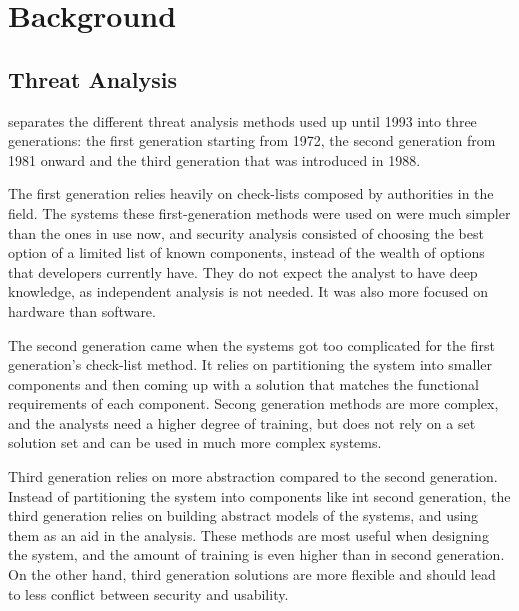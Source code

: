 \chapter{Background}
\label{chapter:background} 


\section{Threat Analysis}



\newpage
{}


\citet{threat_analysis_1993} separates the different threat analysis methods used up until 1993 into three generations: the first generation starting from 1972, the second generation from 1981 onward and the third generation that was introduced in 1988.

The first generation relies heavily on check-lists composed by authorities in the field. 
The systems these first-generation methods were used on were much simpler than the ones in use now, and security analysis consisted of choosing the best option of a limited list of known components, instead of the wealth of options that developers currently have.
They do not expect the analyst to have deep knowledge, as independent analysis is not needed.
It was also more focused on hardware than software. \cite{threat_analysis_1993}

The second generation came when the systems got too complicated for the first generation's check-list method. 
It relies on partitioning the system into smaller components and then coming up with a solution that matches the functional requirements of each component.
Secong generation methods are more complex, and the analysts need a higher degree of training, but does not rely on a set solution set and can be used in much more complex systems. \cite{threat_analysis_1993}

Third generation relies on more abstraction compared to the second generation. 
Instead of partitioning the system into components like int second generation, the third generation relies on building abstract models of the systems, and using them as an aid in the analysis.
These methods are most useful when designing the system, and the amount of training is even higher than in second generation.
On the other hand, third generation solutions are more flexible and should lead to less conflict between security and usability. \cite{threat_analysis_1993}

